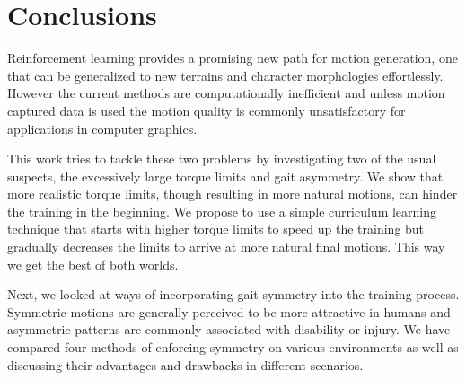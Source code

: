 \chapter{Conclusions}
\label{ch:conclusions}

Reinforcement learning provides a promising new path for motion generation, one that can be generalized to new terrains and character morphologies effortlessly. However the current methods are computationally inefficient and unless motion captured data is used the motion quality is commonly unsatisfactory for applications in computer graphics.

This work tries to tackle these two problems by investigating two of the usual suspects, the excessively large torque limits and gait asymmetry. We show that more realistic torque limits, though resulting in more natural motions, can hinder the training in the beginning. We propose to use a simple curriculum learning technique that starts with higher torque limits to speed up the training but gradually decreases the limits to arrive at more natural final motions. This way we get the best of both worlds.

Next, we looked at ways of incorporating gait symmetry into the training process. Symmetric motions are generally perceived to be more attractive in humans and asymmetric patterns are commonly associated with disability or injury. We have compared four methods of enforcing symmetry on various environments as well as discussing their advantages and drawbacks in different scenarios.